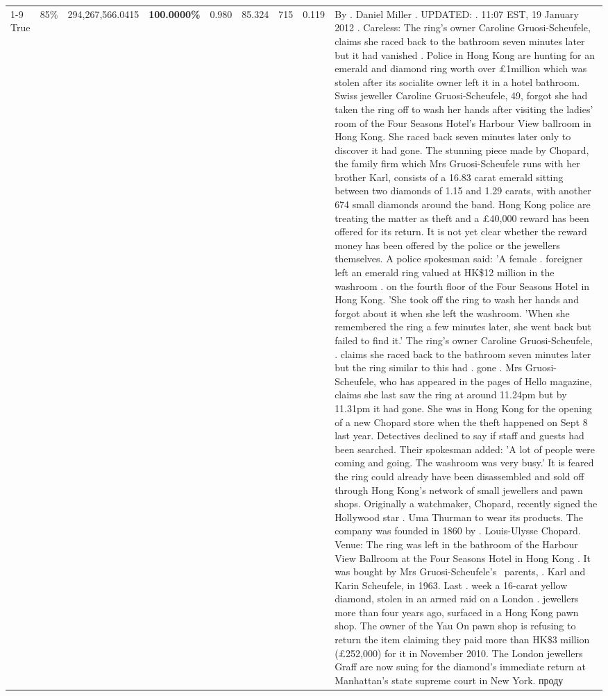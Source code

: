 \begin{table}[H]
\begin{tabular}{lllrlllll}
\cline{1-9} \cline{2-9}
True & 85\% & 294,267,566.0415 & \bfseries \color{red} 100.0000\% & 0.980 & 85.324 & 715 & 0.119 & By . Daniel Miller . UPDATED: . 11:07 EST, 19 January 2012 . Careless: The ring's owner Caroline Gruosi-Scheufele, claims she raced back to the bathroom seven minutes later but it had vanished . Police in Hong Kong are hunting for an emerald and diamond ring worth over £1million which was stolen after its socialite owner left it in a hotel bathroom. Swiss jeweller Caroline Gruosi-Scheufele, 49, forgot she had taken the ring off to wash her hands after visiting the ladies' room of the Four Seasons Hotel's Harbour View ballroom in Hong Kong. She raced back seven minutes later only to discover it had gone. The stunning piece made by Chopard, the family firm which Mrs Gruosi-Scheufele runs with her brother Karl, consists of a 16.83 carat emerald sitting between two diamonds of 1.15 and 1.29 carats, with another 674 small diamonds around the band. Hong Kong police are treating the matter as theft and a £40,000 reward has been offered for its return. It is not yet clear whether the reward money has been offered by the police or the jewellers themselves. A police spokesman said: 'A female . foreigner left an emerald ring valued at HK\$12 million in the washroom . on the fourth floor of the Four Seasons Hotel in Hong Kong. 'She took off the ring to wash her hands and forgot about it when she left the washroom. 'When she remembered the ring a few minutes later, she went back but failed to find it.' The ring's owner Caroline Gruosi-Scheufele, . claims she raced back to the bathroom seven minutes later but the ring similar to this had . gone . Mrs Gruosi-Scheufele, who has appeared in the pages of Hello magazine, claims she last saw the ring at around 11.24pm but by 11.31pm it had gone. She was in Hong Kong for the opening of a new Chopard store when the theft happened on Sept 8 last year. Detectives declined to say if staff and guests had been searched. Their spokesman added: 'A lot of people were coming and going. The washroom was very busy.' It is feared the ring could already have been disassembled and sold off through Hong Kong's network of small jewellers and pawn shops. Originally a watchmaker, Chopard, recently signed the Hollywood star . Uma Thurman to wear its products. The company was founded in 1860 by . Louis-Ulysse Chopard. Venue: The ring was left in the bathroom of the Harbour View Ballroom at the Four Seasons Hotel in Hong Kong . It was bought by Mrs Gruosi-Scheufele's  parents, . Karl and Karin Scheufele, in 1963. Last . week a 16-carat yellow diamond, stolen in an armed raid on a London . jewellers more than four years ago, surfaced in a Hong Kong pawn shop. The owner of the Yau On pawn shop is refusing to return the item claiming they paid more than HK\$3 million (£252,000) for it in November 2010. The London jewellers Graff are now suing for the diamond’s immediate return at Manhattan’s state supreme court in New York. проду \\

\end{tabular}
\end{table}
